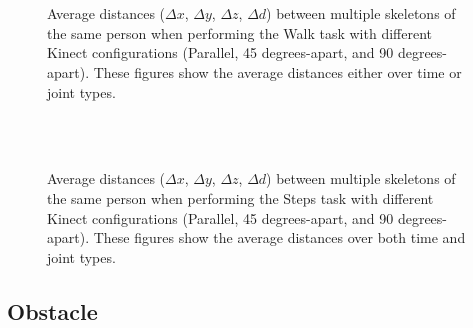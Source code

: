 \documentclass{sigchi}
\begin{document}
\begin{figure}
  \centering

  
   \\
  
   \\
  
  

  \caption{Average distances ($\Delta x$, $\Delta y$, $\Delta z$, $\Delta d$) between multiple skeletons
    of the same person when performing the Walk task with different Kinect configurations
    (Parallel, 45 degrees-apart, and 90 degrees-apart). These figures show the average distances either
    over time or joint types.}

  \label{fig:results_walk}
\end{figure}


\begin{figure}
  \centering

   \\
   \\
  

  \caption{Average distances ($\Delta x$, $\Delta y$, $\Delta z$, $\Delta d$) between multiple skeletons
    of the same person when performing the Steps task with different Kinect configurations
    (Parallel, 45 degrees-apart, and 90 degrees-apart). These figures show the average distances over both
    time and joint types.}

  \label{fig:results_walk_3d}
\end{figure}

\subsection{Obstacle}
\end{document}

